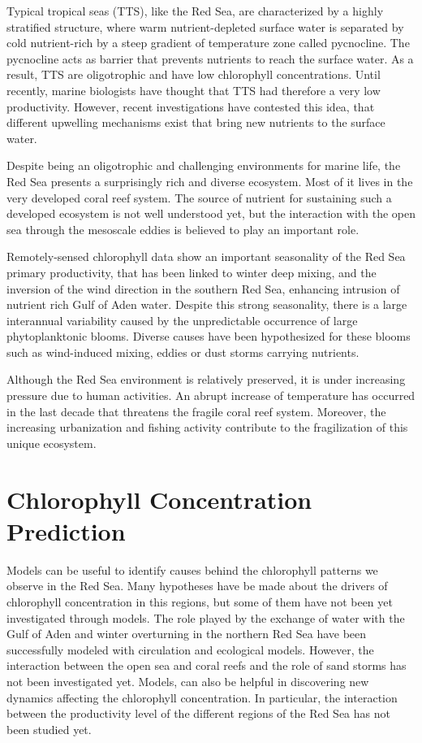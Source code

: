 Typical tropical seas (TTS), like the Red Sea, are characterized by a highly stratified structure, where warm nutrient-depleted surface water is separated by cold nutrient-rich by a steep gradient of temperature zone called pycnocline. The pycnocline acts as barrier that prevents nutrients to reach the surface water. As a result, TTS are oligotrophic and have low chlorophyll concentrations. Until recently, marine biologists have thought that TTS had therefore a very low productivity. However, recent investigations have contested this idea, that different upwelling mechanisms exist that bring new nutrients to the surface water. 

Despite being an oligotrophic and challenging environments for marine life, the Red Sea presents a surprisingly rich and diverse ecosystem. Most of it lives in the very developed coral reef system. The source of nutrient for sustaining such a developed ecosystem is not well understood yet, but the interaction with the open sea through the mesoscale eddies is believed to play an important role. 

Remotely-sensed chlorophyll data show an important seasonality of the Red Sea primary productivity, that has been linked to winter deep mixing, and the inversion of the wind direction in the southern Red Sea, enhancing intrusion of nutrient rich Gulf of Aden water. Despite this strong seasonality, there is a large interannual variability caused by the unpredictable occurrence of large phytoplanktonic blooms. Diverse causes have been hypothesized for these blooms such as wind-induced mixing, eddies or dust storms carrying nutrients. 

Although the Red Sea environment is relatively preserved, it is under increasing pressure due to human activities. An abrupt increase of temperature has occurred in the last decade that threatens the fragile coral reef system. Moreover, the increasing urbanization and fishing activity contribute to the fragilization of this unique ecosystem.

\section{Chlorophyll Concentration Prediction}

Models can be useful to identify causes behind the chlorophyll patterns we observe in the Red Sea. Many hypotheses have be made about the drivers of chlorophyll concentration in this regions, but some of them have not been yet investigated through models. The role played by the exchange of water with the Gulf of Aden and winter overturning in the northern Red Sea have been successfully modeled with circulation and ecological models. However, the interaction between the open sea and coral reefs and the role of sand storms has not been investigated yet. Models, can also be helpful in discovering new dynamics affecting the chlorophyll concentration. In particular, the interaction between the productivity level of the different regions of the Red Sea has not been studied yet.  

